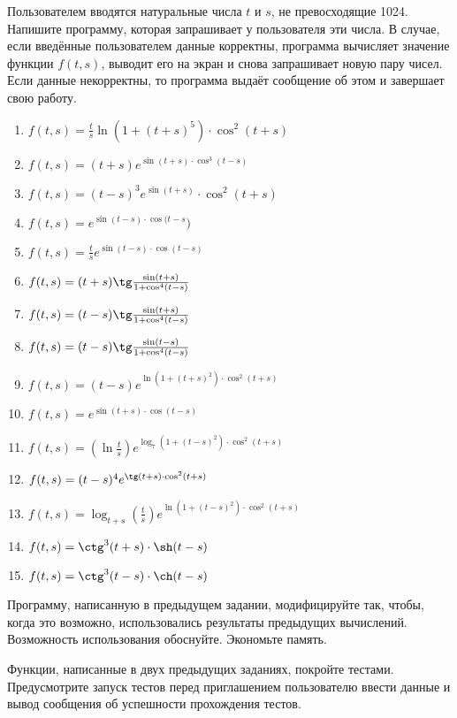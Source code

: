 
\labtask

Пользователем вводятся натуральные числа $t$ и $s$, не превосходящие 1024.
Напишите программу, которая запрашивает у пользователя эти числа.
В случае, если введённые пользователем данные корректны, программа вычисляет значение функции $f(t,s)$, выводит его на экран и снова запрашивает новую пару чисел.
Если данные некорректны, то программа выдаёт сообщение об этом и завершает свою работу.

\begin{enumerate}
	\item
		$f(t,s)=\frac{t}{s} \ln(1+(t+s)^5) \cdot \cos^2(t+s)$
	\item
		$f(t,s)=(t+s)e^{\sin(t+s) \cdot \cos^3(t-s)}$
	\item
		$f(t,s)=(t-s)^3 e^{\sin(t+s)} \cdot \cos^2(t+s)$
	\item
		$f(t,s)=e^{\sin(t-s) \cdot \cos(t-s})$
	\item
		$f(t,s)=\frac{t}{s}e^{\sin(t-s) \cdot \cos(t-s)}$
	\item
		$f(t,s)=(t+s)\tg \frac{\sin(t+s)}{1+\cos^4(t-s)}$
	\item
		$f(t,s)=(t-s)\tg \frac{\sin(t+s)}{1+\cos^4(t-s)}$
	\item
		$f(t,s)=(t-s)\tg \frac{\sin(t-s)}{1+\cos^4(t-s)}$
	\item
		$f(t,s)=(t-s)e^{\ln(1+(t+s)^2) \cdot \cos^2(t+s)}$
	\item
		$f(t,s)=e^{\sin(t+s) \cdot \cos(t-s)}$
	\item
		$f(t,s)=\left(\ln\frac{t}{s}\right)e^{\log_7 (1+(t-s)^2) \cdot \cos^2(t+s)}$
	\item
		$f(t,s)=(t-s)^4 e^{\tg(t+s) \cdot \cos^2(t+s)}$
	\item
		$f(t,s)=\log_{t+s} \left(\frac{t}{s}\right)e^{\ln(1+(t-s)^2) \cdot \cos^2(t+s)}$
	\item
		$f(t,s)=\ctg^3(t+s) \cdot \sh(t-s)$
	\item
		$f(t,s)=\ctg^3(t-s) \cdot \ch(t-s)$
\end{enumerate}

\labtask

Программу, написанную в предыдущем задании, модифицируйте так, чтобы, когда это возможно, использовались результаты предыдущих вычислений.
Возможность использования обоснуйте.
Экономьте память.

\labtask

Функции, написанные в двух предыдущих заданиях, покройте тестами.
Предусмотрите запуск тестов перед приглашением пользователю ввести данные и вывод сообщения об успешности прохождения тестов.


